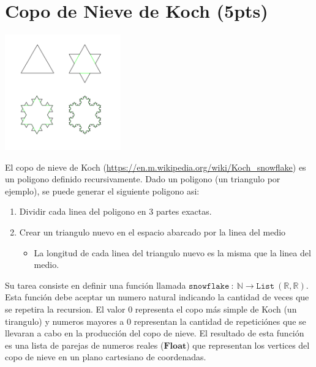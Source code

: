 \documentclass{article}
\begin{document}
\section*{Copo de Nieve de Koch (5pts)}
\begin{center}
    \includegraphics[width=5cm]{include/koch.png}
\end{center}
El copo de nieve de Koch (\url{https://en.m.wikipedia.org/wiki/Koch_snowflake}) es un poligono definido recursivamente.
Dado un poligono (un triangulo por ejemplo), se puede generar el
siguiente poligono asi:
\begin{enumerate}
        \item{Dividir cada linea del poligono en 3 partes exactas.}
        \item{Crear un triangulo nuevo en el espacio abarcado por la linea del medio
        \begin{itemize}
                \item{La longitud de cada linea del triangulo nuevo es la misma que la
                linea del medio.}
        \end{itemize}
        }
\end{enumerate}
Su tarea consiste en definir una funci\'on llamada $\mathtt{snowflake}\ :\ \mathbb{N}\rightarrow
\mathtt{List}\ (\mathbb{R},\mathbb{R})$. Esta funci\'on debe aceptar un numero natural indicando
la cantidad de veces que se repetira la recursion. El valor 0 representa el copo m\'as simple
de Koch (un tirangulo) y numeros mayores a 0 representan la cantidad de repetici\'ones que se
llevaran a cabo en la producci\'on del copo de nieve. El resultado de esta funci\'on es una
lista de parejas de numeros reales ($\mathbf{Float}$) que representan los vertices del copo
de nieve en un plano cartesiano de coordenadas.
\end{document}
